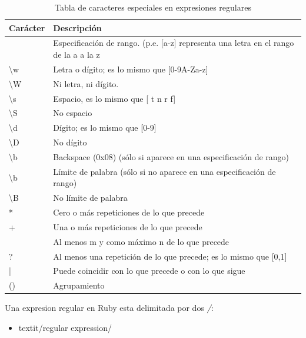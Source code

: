 \documentclass{article}
\begin{document}
\begin{table}[!hbt]
	\begin{center}
	\begin{tabular}{| l | l |}
		\hline
		\rowcolor[gray]{0.9}\textbf{Carácter} & \textbf{Descripción} \\
		\hline
		[] & Especificación de rango. (p.e. [a-z] representa una letra en el rango de la a a la z \\
		\hline
		\textbackslash w & Letra o dígito; es lo mismo que [0-9A-Za-z] \\
		\hline
		\textbackslash W & Ni letra, ni dígito. \\
		\hline
		\textbackslash s & Espacio, es lo mismo que [ t n r f] \\
		\hline
		\textbackslash S & No espacio \\
		\hline
		\textbackslash d & Dígito; es lo mismo que [0-9] \\
		\hline
		\textbackslash D & No dígito \\
		\hline
		\textbackslash b & Backspace (0x08) (sólo si aparece en una especificación de rango) \\
		\hline
		\textbackslash b & Límite de palabra (sólo si no aparece en una especificación de rango) \\
		\hline
		\textbackslash B & No límite de palabra \\
		\hline
		* & Cero o más repeticiones de lo que precede	\\
		\hline
		+ & Una o más repeticiones de lo que precede \\
		\hline
		[m,n] & Al menos m y como máximo n de lo que precede \\
		\hline
		? & Al menos una repetición de lo que precede; es lo mismo que [0,1]	\\
		\hline
		| & Puede coincidir con lo que precede o con lo que sigue \\
		\hline
		() & Agrupamiento \\
		\hline
	\end{tabular}
	\caption{Tabla de caracteres especiales en expresiones regulares}
	\end{center}

\end{table}

	Una expresion regular en Ruby esta delimitada por dos \textit{/}:
\begin{itemize}
	\itemsep=1pt \topsep=0pt \partopsep=0pt \parskip=0pt \parsep=0pt
	\item  		textit{/regular expression/}
\end{itemize}
\end{document}
